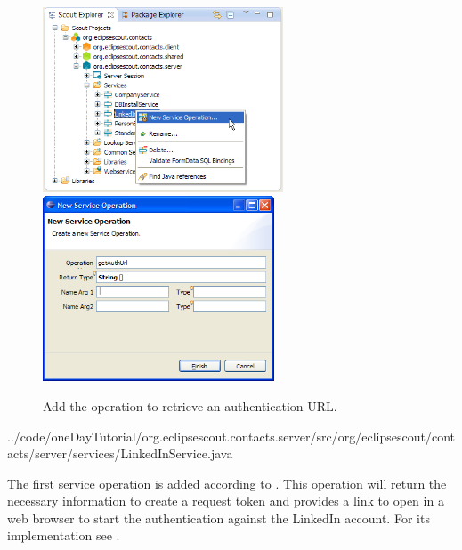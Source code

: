 \documentclass[a4paper,10pt,twoside]{book}
\begin{document}
\begin{figure}
\includegraphics[height=5.5cm]{new_operation_authurl_contextmenu.png} \hspace{5mm}
\includegraphics[height=5.5cm]{new_operation_authurl.png}
\caption{Add the operation to retrieve an authentication URL.}
\end{figure}


{../code/oneDayTutorial/org.eclipsescout.contacts.server/src/org/eclipsescout/contacts/server/services/LinkedInService.java}

The first service operation  is added according to . 
This operation will return the necessary information to create a request token and provides a link to open in a web browser to start the authentication against the LinkedIn account. 
For its implementation see .
\end{document}
